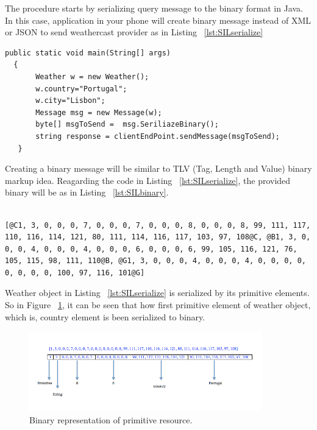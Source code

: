 The procedure starts by serializing query message to the binary format in Java. In this case, application in your phone will create binary message instead of XML or JSON to send weathercast provider as in Listing ~\ref{lst:SILserialize}

\begin{lstlisting}[caption=Creating serialized binary Message, label=lst:SILserialize]
  public static void main(String[] args)
  {
       Weather w = new Weather();
       w.country="Portugal";
       w.city="Lisbon";
       Message msg = new Message(w);
       byte[] msgToSend =  msg.SeriliazeBinary();
       string response = clientEndPoint.sendMessage(msgToSend);
   }
\end{lstlisting}

Creating a binary message will be similar to TLV (Tag, Length and Value) binary markup idea. Reagarding the code in Listing ~\ref{lst:SILserialize}, the provided binary will be as in Listing ~\ref{lst:SILbinary}.

\begin{lstlisting}[caption=Creating serialized binary Message, label=lst:SILbinary]

[@C1, 3, 0, 0, 0, 7, 0, 0, 0, 7, 0, 0, 0, 8, 0, 0, 0, 8, 99, 111, 117, 110, 116, 114, 121, 80, 111, 114, 116, 117, 103, 97, 108@C, @B1, 3, 0, 0, 0, 4, 0, 0, 0, 4, 0, 0, 0, 6, 0, 0, 0, 6, 99, 105, 116, 121, 76, 105, 115, 98, 111, 110@B, @G1, 3, 0, 0, 0, 4, 0, 0, 0, 4, 0, 0, 0, 0, 0, 0, 0, 0, 100, 97, 116, 101@G]

\end{lstlisting}

Weather object in Listing ~\ref{lst:SILserialize} is serialized by its primitive elements. So in Figure ~\ref{fig:bianryprim}, it can be seen that how first primitive element of weather object, which is, country element is been serialized to binary.

\begin{figure}[!htb]
  \centering
  \includegraphics[width=0.9\textwidth]{Figures/binaryrep2.png}
  \caption[Binary representation of primitive resource.]{Binary representation of primitive resource.}
  \label{fig:bianryprim}
\end{figure}

